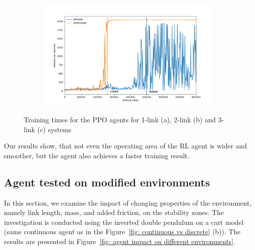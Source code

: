 \begin{figure}[h!]
\begin{subfigure}[t]{0.48\textwidth}
		\label{fig: dp - training time}
		\caption{}
	\end{subfigure}
	\begin{subfigure}[t]{0.48\textwidth}
		\centering
		\includegraphics[width=\textwidth]{Figures/TP_discrete_vs_continuous_training_time.png}
		\label{fig: tp - training time}
		\caption{}
	\end{subfigure}
	
	\caption{Training times for the PPO agents for 1-link (a), 2-link (b) and 3-link (c) systems}
	\label{fig: training time comparison}
\end{figure}

Our results show, that not even the operating area of the RL agent is wider and smoother, but the agent also achieves a faster training result. 

\subsection{Agent tested on modified environments} \label{subsec: Agent tested on modified environments}
In this section, we examine the impact of changing properties of the environment, namely
link length, mass, and added friction, on the stability zones. The investigation is conducted
using the inverted double pendulum on a cart model (same continuous agent as in the Figure~\ref{fig: continuous vs discrete} (b)). The results are presented in Figure~\ref{fig: agent impact on different environments}.

